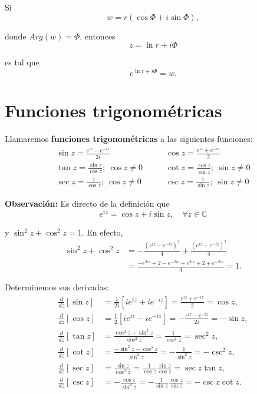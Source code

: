 Si 
$$w = r (\cos \Phi + i \sin\Phi),$$

donde $Arg(w) = \Phi$, entonces 
$$z = \ln r + i\Phi$$

es tal que 
$$e^{\ln r + i \Phi} = w.$$

\section{Funciones trigonométricas}

\begin{defi}
Llamaremos \textbf{funciones trigonométricas} a las siguientes funciones:
\begin{align*}
\sin z = \frac{e^{iz} - e^{-iz}}{2i} &\qquad \cos z = \frac{e^{iz} + e^{-iz}}{2} \\
\tan z = \frac{\sin z}{\cos z}; ~ \cos z\neq 0 &\qquad \cot z = \frac{\cos z}{\sin z};~\sin z \neq 0 \\
\sec z = \frac{1}{\cos z}; ~ \cos z \neq 0 &\qquad \csc z = \frac{1}{\sin z}; ~ \sin z \neq 0
\end{align*}
\end{defi}

\textbf{Observación:} Es directo de la definición que
$$e^{iz} = \cos z + i \sin z, \quad \forall z \in \mathbb{C}$$

y $\sin^2 z + \cos^2 z = 1$. En efecto,
\begin{align*}
    \sin^2 z + \cos^2 z  &= -\frac{(e^{iz} - e^{-iz})^2}{4} + \frac{(e^{iz} + e^{-iz})^2}{4} \\
    &= \frac{- e^{2iz} + 2 -  e^{-2iz} + e^{2iz} +2 +e^{-2iz}}{4} = 1.
\end{align*}

Determinemos sus derivadas:
\begin{align*}
\frac{d}{dz}[\sin z] &= \frac{1}{2i} [i e^{iz} + i e^{-iz}] = \frac{e^{iz} + e^{-iz}}{2} = \cos z, \\
\frac{d}{dz}[\cos z] &= \frac{1}{2} [i e^{iz} - i e^{-iz}] = - \frac{e^{iz} - e^{-iz}}{2i} = - \sin z, \\
\frac{d}{dz}[\tan z] &= \frac{\cos^2 z + \sin^2 z}{\cos^2 z} = \frac{1}{\cos^2 z} = \sec^2 z, \\
\frac{d}{dz} [\cot z] &= \frac{-\sin^2 z - \cos^2 z}{\sin^2 z} = -\frac{1}{\sin^2 z} = -\csc^2 z, \\
\frac{d}{dz}[\sec z] &= \frac{\sin z}{\cos^2 z} = \frac{1}{\cos z} \frac{\sin z}{\cos z}  = \sec z \tan z, \\
 \frac{d}{dz}[\csc z] &= - \frac{\cos z}{\sin^2 z} = -\frac{1}{\sin z} \frac{\cos z}{\sin z}  = -\csc z \cot z.
\end{align*}

